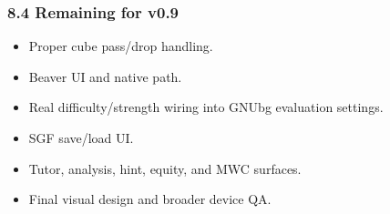 \documentclass[11pt,a4paper]{article}
\providecommand{\tightlist}{\setlength{\itemsep}{2pt}\setlength{\parskip}{0pt}}
\begin{document}
\subsubsection{8.4 Remaining for v0.9}

\begin{itemize}
\tightlist
\item
  Proper cube pass/drop handling.
\item
  Beaver UI and native path.
\item
  Real difficulty/strength wiring into GNUbg evaluation settings.
\item
  SGF save/load UI.
\item
  Tutor, analysis, hint, equity, and MWC surfaces.
\item
  Final visual design and broader device QA.
\end{itemize}
\end{document}
